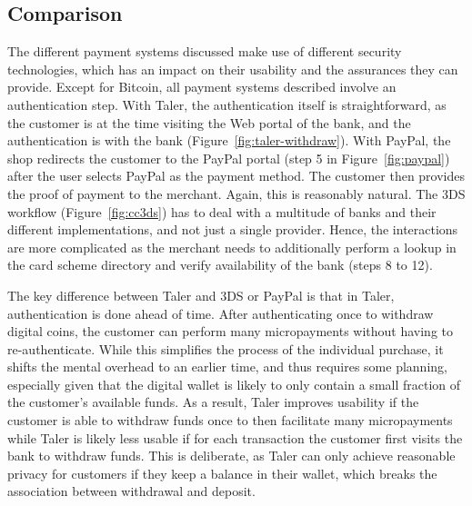 \documentclass{IEEEtran}
\begin{document}
\subsection{Comparison}

The different payment systems discussed make use of different security
technologies, which has an impact on their usability and the
assurances they can provide.  Except for Bitcoin, all payment systems
described involve an authentication step.
With Taler, the authentication itself is straightforward, as the customer is
at the time visiting the Web portal of the bank, and the authentication is
with the bank (Figure~\ref{fig:taler-withdraw}).  With PayPal, the
shop redirects the customer to the PayPal portal (step 5 in
Figure~\ref{fig:paypal}) after the user selects PayPal as the payment
method. The customer then provides the proof of payment to the
merchant.  Again, this is reasonably natural.  The 3DS workflow
(Figure~\ref{fig:cc3ds}) has to deal with a multitude of banks and
their different implementations, and not just a single provider.
Hence, the interactions are more complicated as the merchant needs to
additionally perform a lookup in the card scheme directory and verify
availability of the bank (steps 8 to 12).

The key difference between Taler and 3DS or PayPal is that
in Taler, authentication is done ahead of time.
After authenticating once to withdraw digital coins, the customer can
perform many micropayments without having to re-authenticate.  While
this simplifies the process of the individual purchase, it shifts the
mental overhead to an earlier time, and thus requires some planning,
especially given that the digital wallet is likely to only contain a
small fraction of the customer's available funds.  As a result, Taler
improves usability if the customer is able to withdraw funds once to
then facilitate many micropayments while Taler is likely less usable
if for each transaction the customer first visits the bank to withdraw
funds.  This is deliberate, as Taler can only achieve reasonable
privacy for customers if they keep a balance in their wallet,
which breaks the association between withdrawal and deposit.
\end{document}
